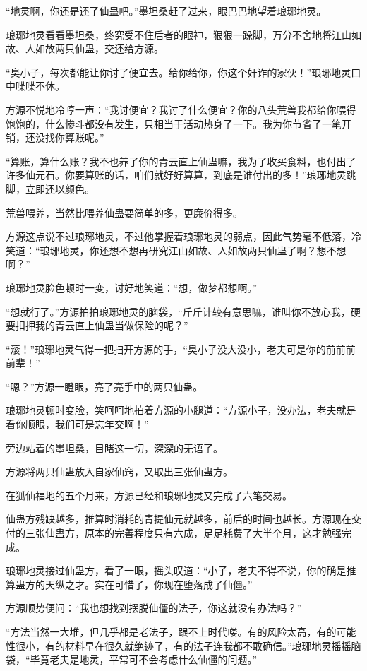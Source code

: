 \begin{this_body}
“地灵啊，你还是还了仙蛊吧。”墨坦桑赶了过来，眼巴巴地望着琅琊地灵。

琅琊地灵看看墨坦桑，终究受不住后者的眼神，狠狠一跺脚，万分不舍地将江山如故、人如故两只仙蛊，交还给方源。

“臭小子，每次都能让你讨了便宜去。给你给你，你这个奸诈的家伙！”琅琊地灵口中喋喋不休。

方源不悦地冷哼一声：“我讨便宜？我讨了什么便宜？你的八头荒兽我都给你喂得饱饱的，什么惨斗都没有发生，只相当于活动热身了一下。我为你节省了一笔开销，还没找你算账呢。”

“算账，算什么账？我不也养了你的青云直上仙蛊嘛，我为了收买食料，也付出了许多仙元石。你要算账的话，咱们就好好算算，到底是谁付出的多！”琅琊地灵跳脚，立即还以颜色。

荒兽喂养，当然比喂养仙蛊要简单的多，更廉价得多。

方源这点说不过琅琊地灵，不过他掌握着琅琊地灵的弱点，因此气势毫不低落，冷笑道：“琅琊地灵，你还想不想再研究江山如故、人如故两只仙蛊了啊？想不想啊？”

琅琊地灵脸色顿时一变，讨好地笑道：“想，做梦都想啊。”

“想就行了。”方源拍拍琅琊地灵的脑袋，“斤斤计较有意思嘛，谁叫你不放心我，硬要扣押我的青云直上仙蛊当做保险的呢？”

“滚！”琅琊地灵气得一把扫开方源的手，“臭小子没大没小，老夫可是你的前前前前辈！”

“嗯？”方源一瞪眼，亮了亮手中的两只仙蛊。

琅琊地灵顿时变脸，笑呵呵地拍着方源的小腿道：“方源小子，没办法，老夫就是看你顺眼，我们可是忘年交啊！”

旁边站着的墨坦桑，目睹这一切，深深的无语了。

方源将两只仙蛊放入自家仙窍，又取出三张仙蛊方。

在狐仙福地的五个月来，方源已经和琅琊地灵又完成了六笔交易。

仙蛊方残缺越多，推算时消耗的青提仙元就越多，前后的时间也越长。方源现在交付的三张仙蛊方，原本的完善程度只有六成，足足耗费了大半个月，这才勉强完成。

琅琊地灵接过仙蛊方，看了一眼，摇头叹道：“小子，老夫不得不说，你的确是推算蛊方的天纵之才。实在可惜了，你现在堕落成了仙僵。”

方源顺势便问：“我也想找到摆脱仙僵的法子，你这就没有办法吗？”

“方法当然一大堆，但几乎都是老法子，跟不上时代喽。有的风险太高，有的可能性很小，有的材料早在很久就绝迹了，有的法子连我都不敢确信。”琅琊地灵摇摇脑袋，“毕竟老夫是地灵，平常可不会考虑什么仙僵的问题。”


\end{this_body}
